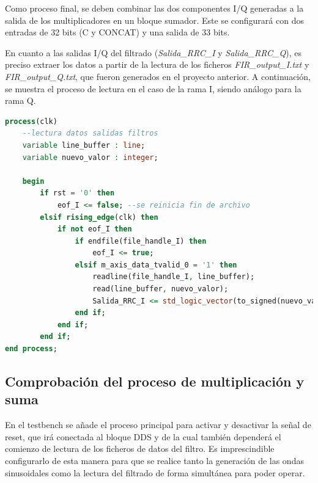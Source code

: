 \vspace{3mm}

Como proceso final, se deben combinar las dos componentes I/Q generadas a la salida de los multiplicadores en un bloque sumador. Este se configurará con dos entradas de 32 bits (C y CONCAT) y una salida de 33 bits.

\vspace{3mm}

En cuanto a las salidas I/Q del filtrado (\textit{Salida\_RRC\_I} y \textit{Salida\_RRC\_Q}), es preciso extraer los datos a partir de la lectura de los ficheros \textit{FIR\_output\_I.txt} y \textit{FIR\_output\_Q.txt}, que fueron generados en el proyecto anterior. A continuación, se muestra el proceso de lectura en el caso de la rama I, siendo análogo para la rama Q.

\pagebreak

\vspace{3mm}

\begin{lstlisting}[language=VHDL, style=mystyle, caption={Proceso de lectura del fichero de salida del filtrado (rama I)}]
process(clk) 
    --lectura datos salidas filtros
    variable line_buffer : line;
    variable nuevo_valor : integer;
        
    begin
        if rst = '0' then
            eof_I <= false; --se reinicia fin de archivo
        elsif rising_edge(clk) then 
            if not eof_I then
                if endfile(file_handle_I) then 
                    eof_I <= true; 
                elsif m_axis_data_tvalid_0 = '1' then
                    readline(file_handle_I, line_buffer);
                    read(line_buffer, nuevo_valor);
                    Salida_RRC_I <= std_logic_vector(to_signed(nuevo_valor, Salida_RRC_I'length));
                end if;
            end if;
        end if;    
end process;  
\end{lstlisting}

\vspace{1mm}

\subsection{Comprobación del proceso de multiplicación y suma}

En el testbench se añade el proceso principal para activar y desactivar la señal de reset, que irá conectada al bloque DDS y de la cual también dependerá el comienzo de lectura de los ficheros de datos del filtro. Es imprescindible configurarlo de esta manera para que se realice tanto la generación de las ondas sinusoidales como la lectura del filtrado de forma simultánea para poder operar.


